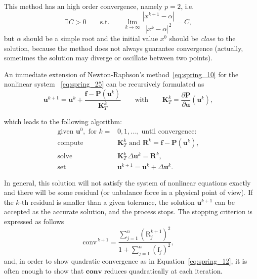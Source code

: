 This method has an high order convergence, namely $p=2$, i.e.
\begin{equation}
\label{eq:spring_12}
\exists C>0\qquad\text{s.t.}\qquad \lim_{k\to\infty}\frac{\left| x^{k+1}-\alpha \right|}{\left| x^{k}-\alpha \right|^2}=C,
\end{equation}
but $\alpha$ should be a simple root and the initial value $x^0$ should be \emph{close} to the solution, because the method does not always guarantee convergence (actually, sometimes the solution may diverge or oscillate between two points). 

An immediate extension of Newton-Raphson’s method~\eqref{eq:spring_10} for the nonlinear system ~\eqref{eq:spring_25} can be recursively formulated as
\begin{equation}
\label{eq:spring_13}
\mathbf{u}^{k+1}=\mathbf{u}^k+\frac{ \mathbf{f}-\mathbf{P}(\mathbf{u}^k) }{\mathbf{K}_T^k}\qquad \text{with}\qquad \mathbf{K}_T^k=\frac{\partial\mathbf{P}}{\partial\mathbf{u}}(\mathbf{u}^k) ,
\end{equation}

which leads to the following algorithm:
\begin{subequations}
\label{eq:spring_14}
\begin{align}
\text{given }\mathbf{u}^0,\text{ for }k=&0,1,\dots,\text{ until convergence:} \nonumber \\
\text{compute}\qquad&\mathbf{K}_T^k\text{ and } \mathbf{R}^k=\mathbf{f}-\mathbf{P}(\mathbf{u}^k) , \label{eq:spring_15} \\
\text{solve}\qquad &\mathbf{K}_T^k\,\Delta\mathbf{u}^k=\mathbf{R}^k , \label{eq:spring_16} \\
\text{set}\qquad&\mathbf{u}^{k+1}=\mathbf{u}^k+\Delta\mathbf{u}^k. \label{eq:spring_17}
\end{align}
\end{subequations}

In general, this solution will not satisfy the system of nonlinear equations exactly and there will be some residual (or unbalance force in a physical point of view). If the $k$-th residual is smaller than a given tolerance, the solution $\mathbf{u}^{k+1}$ can be accepted as the accurate solution, and the process stops. The stopping criterion is expressed as follows
\begin{equation}
\label{eq:spring_18}
\text{conv}^{\,k+1}=\frac{\displaystyle\sum_{j=1}^n\left( \text{R}_j^{k+1} \right)^2}{1+\displaystyle\sum_{j=1}^n\left( \text{f}_j \right)^2},
\end{equation}
and, in order to show quadratic convergence as in Equation~\eqref{eq:spring_12}, it is often enough to show that $\textbf{conv}$ reduces quadratically at each iteration.

